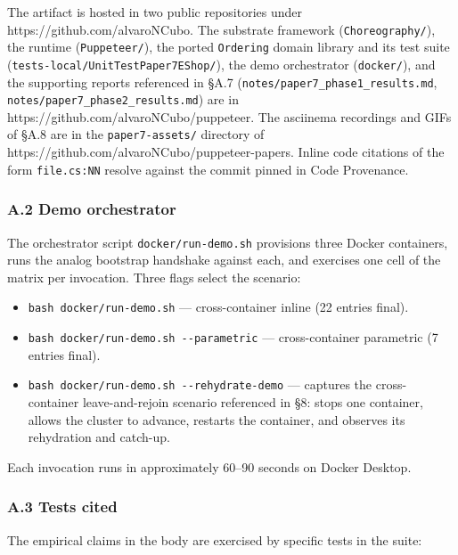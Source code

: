 \documentclass[
]{article}
\providecommand{\tightlist}{%
  \setlength{\itemsep}{0pt}\setlength{\parskip}{0pt}}
\begin{document}
The artifact is hosted in two public repositories under
https://github.com/alvaroNCubo. The substrate framework
(\texttt{Choreography/}), the runtime (\texttt{Puppeteer/}), the ported
\texttt{Ordering} domain library and its test suite
(\texttt{tests-local/UnitTestPaper7EShop/}), the demo orchestrator
(\texttt{docker/}), and the supporting reports referenced in §A.7
(\texttt{notes/paper7\_phase1\_results.md},
\texttt{notes/paper7\_phase2\_results.md}) are in
https://github.com/alvaroNCubo/puppeteer. The asciinema recordings and
GIFs of §A.8 are in the \texttt{paper7-assets/} directory of
https://github.com/alvaroNCubo/puppeteer-papers. Inline code citations
of the form \texttt{file.cs:NN} resolve against the commit pinned in
Code Provenance.

\subsubsection{A.2 Demo orchestrator}\label{a.2-demo-orchestrator}

The orchestrator script \texttt{docker/run-demo.sh} provisions three
Docker containers, runs the analog bootstrap handshake against each, and
exercises one cell of the matrix per invocation. Three flags select the
scenario:

\begin{itemize}
\tightlist
\item
  \texttt{bash\ docker/run-demo.sh} --- cross-container inline (22
  entries final).
\item
  \texttt{bash\ docker/run-demo.sh\ -\/-parametric} --- cross-container
  parametric (7 entries final).
\item
  \texttt{bash\ docker/run-demo.sh\ -\/-rehydrate-demo} --- captures the
  cross-container leave-and-rejoin scenario referenced in §8: stops one
  container, allows the cluster to advance, restarts the container, and
  observes its rehydration and catch-up.
\end{itemize}

Each invocation runs in approximately 60--90 seconds on Docker Desktop.

\subsubsection{A.3 Tests cited}\label{a.3-tests-cited}

The empirical claims in the body are exercised by specific tests in the
suite:
\end{document}
